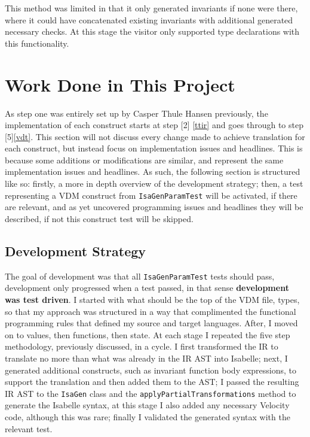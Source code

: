 	This method was limited in that it only generated invariants if none were there, where it could have concatenated existing invariants with additional generated necessary checks. At this stage the visitor only supported type declarations with this functionality.

	\section{Work Done in This Project}
	As step one was entirely set up by Casper Thule Hansen previously, the implementation of each construct starts at step [2] \ref{ttir} and goes through to step [5]\ref{vdt}. This section will not discuss every change made to achieve translation for each construct, but instead focus on implementation issues and headlines. This is because some additions or modifications are similar, and represent the same implementation issues and headlines. As such, the following section is structured like so: firstly, a more in depth overview of the development strategy; then, a test representing a VDM construct from \lstinline[language=Java]{IsaGenParamTest} will be activated, if there are relevant, and as yet uncovered programming issues and headlines they will be described, if not this construct test will be skipped.

	\subsection{Development Strategy}
	The goal of development was that all \lstinline[language=Java]{IsaGenParamTest} tests should pass, development only progressed when a test passed, in that sense \textbf{development was test driven}. I started with what should be the top of the VDM file, types, so that my approach was structured in a way that complimented the functional programming rules that defined my source and target languages. After, I moved on to values, then functions, then state. At each stage I repeated the five step methodology, previously discussed, in a cycle. I first transformed the IR to translate no more than what was already in the IR AST into Isabelle; next, I generated additional constructs, such as invariant function body expressions, to support the translation and then added them to the AST; I passed the resulting IR AST to the \lstinline[language=Java]{IsaGen} class and the \lstinline[language=Java]{applyPartialTransformations} method to generate the Isabelle syntax, at this stage I also added any necessary Velocity code, although this was rare; finally I validated the generated syntax with the relevant test.


